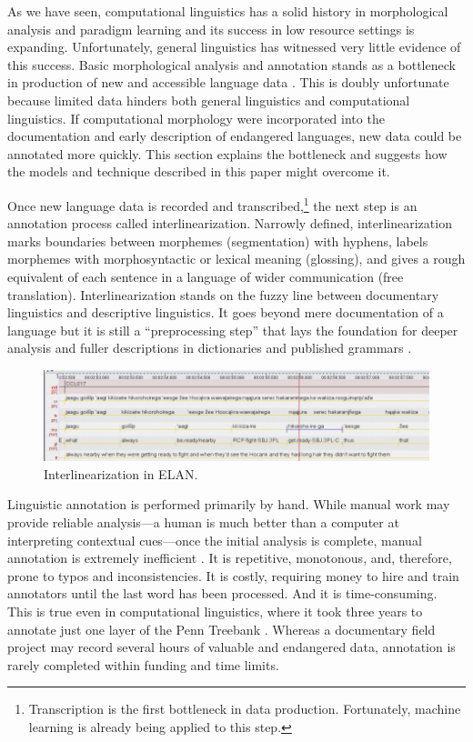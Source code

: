 \documentclass[12pt]{article}
\begin{document}
As we have seen, computational linguistics has a solid history in morphological analysis and paradigm learning and its success in low resource settings is expanding. Unfortunately, general linguistics has witnessed very little evidence of this success. Basic morphological analysis and annotation stands as a bottleneck in production of new and accessible language data \cite{holton_developing_2017}. This is doubly unfortunate because limited data hinders both general linguistics and computational linguistics. If computational morphology were incorporated into the documentation and early description of endangered languages, new data could be annotated more quickly. This section explains the bottleneck and suggests how the models and technique described in this paper might overcome it.

Once new language data is recorded and transcribed,\footnote{Transcription is the first bottleneck in data production. Fortunately, machine learning is already being applied to this step.} the next step is an annotation process called interlinearization. Narrowly defined, interlinearization marks boundaries between morphemes (segmentation) with hyphens, labels morphemes with morphosyntactic or lexical meaning (glossing), and gives a rough equivalent of each sentence in a language of wider communication (free translation). Interlinearization stands on the fuzzy line between documentary linguistics and descriptive linguistics. It goes beyond mere documentation of a language but it is still a ``preprocessing step'' that lays the foundation for deeper analysis and fuller descriptions in dictionaries and published grammars \cite{moon_unsupervised_2009}. 

\begin{figure}[ht]
\label{fig:ELAN}
\begin{center}
\includegraphics[width=0.75\columnwidth]{ELAN.png}
\caption{Interlinearization in ELAN.}
\end{center}
\end{figure}

Linguistic annotation is performed primarily by hand. While manual work may provide reliable analysis---a human is much better than a computer at interpreting contextual cues---once the initial analysis is complete, manual annotation is extremely inefficient \cite{Baldridge06,baldridge_how_2009,palmer_semi-automated_2009}. It is repetitive, monotonous, and, therefore, prone to typos and inconsistencies. It is costly, requiring money to hire and train annotators until the last word has been processed. And it is time-consuming. This is true even in computational linguistics, where it took three years to annotate just one layer of the Penn Treebank \cite{taylor_penn_2003} \cite{duong_natural_2017,he_humanloop_2016}. Whereas a documentary field project may record several hours of valuable and endangered data, annotation is rarely completed within funding and time limits. 
\end{document}
